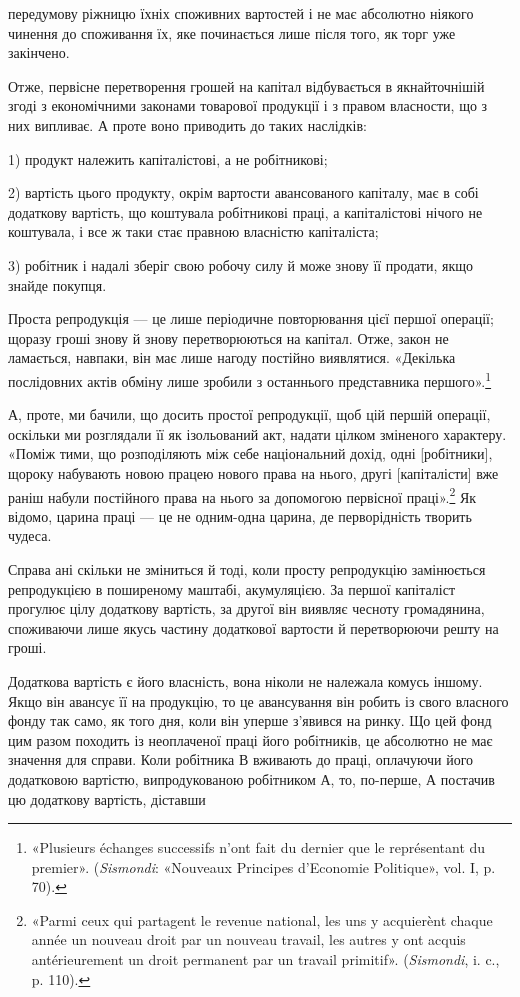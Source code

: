 \parcont{}  %
передумову ріжницю їхніх споживних вартостей і не має абсолютно
ніякого чинення до споживання їх, яке починається лише
після того, як торг уже закінчено.

Отже, первісне перетворення грошей на капітал відбувається
в якнайточнішій згоді з економічними законами товарової продукції
і з правом власности, що з них випливає. А проте воно
приводить до таких наслідків:

1) продукт належить капіталістові, а не робітникові;

2) вартість цього продукту, окрім вартости авансованого капіталу,
має в собі додаткову вартість, що коштувала робітникові
праці, а капіталістові нічого не коштувала, і все ж таки стає
правною власністю капіталіста;

3) робітник і надалі зберіг свою робочу силу й може знову її
продати, якщо знайде покупця.

Проста репродукція — це лише періодичне повторювання
цієї першої операції; щоразу гроші знову й знову перетворюються
на капітал. Отже, закон не ламається, навпаки, він
має лише нагоду постійно виявлятися. «Декілька послідовних
актів обміну лише зробили з останнього представника першого».\footnote*{
«Plusieurs échanges successifs n’ont fait du dernier que le représentant
du premier». (\emph{Sismondi}: «Nouveaux Principes d’Economie Politique»,
vol. I, p. 70).
}

А, проте, ми бачили, що досить простої репродукції, щоб цій
першій операції, оскільки ми розглядали її як ізольований акт,
надати цілком зміненого характеру. «Поміж тими, що розподіляють
між себе національний дохід, одні [робітники], щороку
набувають новою працею нового права на нього, другі [капіталісти]
вже раніш набули постійного права на нього за допомогою
первісної праці».\footnote*{
«Parmi ceux qui partagent le revenue national, les uns y acquierènt
chaque année un nouveau droit par un nouveau travail, les autres y ont acquis
antérieurement un droit permanent par un travail primitif». (\emph{Sismondi},
i. c., p. 110).
} Як відомо, царина праці — це не одним-одна
царина, де перворідність творить чудеса.

Справа ані скільки не зміниться й тоді, коли просту репродукцію
замінюється репродукцією в поширеному маштабі, акумуляцією.
За першої капіталіст прогулює цілу додаткову вартість,
за другої він виявляє чесноту громадянина, споживаючи
лише якусь частину додаткової вартости й перетворюючи решту
на гроші.

Додаткова вартість є його власність, вона ніколи не належала
комусь іншому. Якщо він авансує її на продукцію, то це авансування
він робить із свого власного фонду так само, як того
дня, коли він уперше з’явився на ринку. Що цей фонд цим разом
походить із неоплаченої праці його робітників, це абсолютно не
має значення для справи. Коли робітника В вживають до праці,
оплачуючи його додатковою вартістю, випродукованою робітником
А, то, по-перше, А постачив цю додаткову вартість, діставши
\parbreak{}  %
